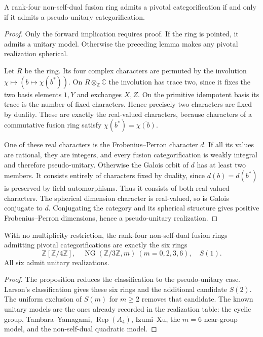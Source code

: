 \begin{proposition}\label{prop:nonselfdual-pivotal-pu}
A rank-four non-self-dual fusion ring admits a pivotal categorification
if and only if it admits a pseudo-unitary categorification.
\end{proposition}
\begin{proof}
Only the forward implication requires proof. If the ring is pointed,
it admits a unitary model. Otherwise the preceding lemma makes any
pivotal realization spherical.

Let $R$ be the ring. Its four complex characters are permuted by the
involution $\chi\mapsto(b\mapsto\chi(b^*))$. On $R\otimes_{\mathbb Z}\mathbb C$
the involution has trace two, since it fixes the two basis elements
$1,Y$ and exchanges $X,Z$. On the primitive idempotent basis its trace
is the number of fixed characters. Hence precisely two characters are
fixed by duality. These are exactly the real-valued characters, because
characters of a commutative fusion ring satisfy
$\chi(b^*)=\overline{\chi(b)}$.

One of these real characters is the Frobenius--Perron character $d$.
If all its values are rational, they are integers, and every fusion
categorification is weakly integral and therefore pseudo-unitary.
Otherwise the Galois orbit of $d$ has at least two members. It consists
entirely of characters fixed by duality, since $d(b)=d(b^*)$ is preserved
by field automorphisms. Thus it consists of both real-valued characters.
The spherical dimension character is real-valued, so is Galois conjugate
to $d$. Conjugating the category and its spherical structure gives
positive Frobenius--Perron dimensions, hence a pseudo-unitary realization.
\end{proof}

\begin{corollary}\label{cor:nonselfdual-unbounded-classification}
With no multiplicity restriction, the rank-four non-self-dual fusion
rings admitting pivotal categorifications are exactly the six rings
\[
 \mathbb Z[\mathbb Z/4\mathbb Z],\quad
 \operatorname{NG}(\mathbb Z/3\mathbb Z,m)\ (m=0,2,3,6),\quad S(1).
\]
All six admit unitary realizations.
\end{corollary}
\begin{proof}
The proposition reduces the classification to the pseudo-unitary case.
Larson's classification gives these six rings and the additional candidate
$S(2)$. The uniform exclusion of $S(m)$ for $m\geq2$ removes that candidate.
The known unitary models are the ones already recorded in the realization
table: the cyclic group, Tambara--Yamagami, $\operatorname{Rep}(A_4)$,
Izumi--Xu, the $m=6$ near-group model, and the non-self-dual quadratic model.
\end{proof}

